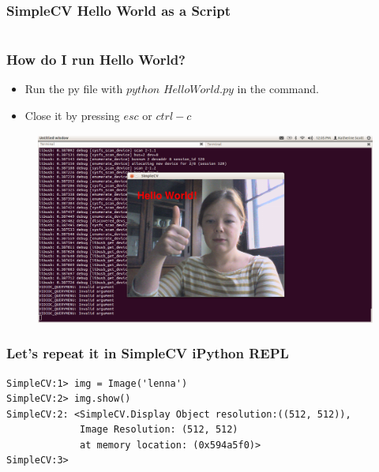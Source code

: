 \documentclass{beamer}
\begin{document}

\begin{frame}[fragile] %
\frametitle{SimpleCV Hello World as a Script}
\begin{example}[HelloWorld.py]
 \inputminted[linenos=true, tabsize=4,
 fontsize=\small]{python}{HelloWorld.py}
\end{example}
\end{frame}
\begin{frame}
\frametitle{How do I run Hello World?}

\begin{itemize}
\item Run the py file with $python$ $HelloWorld.py$ in the command.
\item Close it by pressing $esc$ or $ctrl-c$
\end{itemize}
\begin{figure}
  \includegraphics[width=0.9\linewidth]{HelloWorld1.png}
\end{figure}
\end{frame}

\begin{frame}[fragile] %
\frametitle{Let's repeat it in SimpleCV  iPython REPL}
\begin{example}
\begin{verbatim}
SimpleCV:1> img = Image('lenna')
SimpleCV:2> img.show()
SimpleCV:2: <SimpleCV.Display Object resolution:((512, 512)), 
             Image Resolution: (512, 512) 
             at memory location: (0x594a5f0)>
SimpleCV:3> 
\end{verbatim}
\end{example}
\end{frame}
\end{document}
